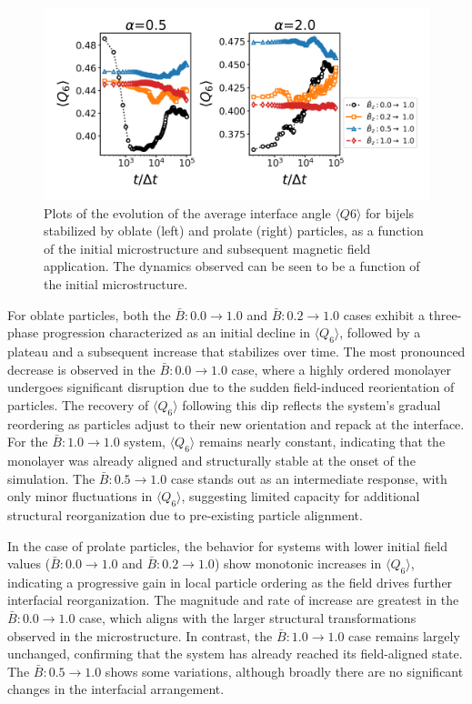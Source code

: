 \begin{figure} 
    \centering 
    \includegraphics[scale=0.6]{../figures/results/paper2/Q6-field_up.png} 
    \caption{Plots of the evolution of the average interface angle \(\langle Q6 \rangle\) for bijels stabilized 
             by oblate (left) and prolate (right) particles, as a function of the initial microstructure and subsequent magnetic field application.
             The dynamics observed can be seen to be a function of the initial microstructure.} 
    \label{fig:Q6-field_up} 
\end{figure}

For oblate particles, both the \(\bar{B}: 0.0 \rightarrow 1.0\) and 
\(\bar{B}: 0.2 \rightarrow 1.0\) cases exhibit a three-phase progression characterized as an initial decline in \(\langle Q_6 \rangle\), followed by a 
plateau and a subsequent increase that stabilizes over time. The most pronounced decrease is observed in the \(\bar{B}: 0.0 \rightarrow 1.0\) case, where a 
highly ordered monolayer undergoes significant disruption due to the sudden field-induced reorientation of particles. The recovery of \(\langle Q_6 \rangle\) 
following this dip reflects the system's gradual reordering as particles adjust to their new orientation and repack at the interface.
For the \(\bar{B}: 1.0 \rightarrow 1.0\) system, \(\langle Q_6 \rangle\) remains nearly constant, indicating that the monolayer was already aligned and 
structurally stable at the onset of the simulation. The \(\bar{B}: 0.5 \rightarrow 1.0\) case stands out as an intermediate response, with only minor 
fluctuations in \(\langle Q_6 \rangle\), suggesting limited capacity for additional structural reorganization due to pre-existing particle alignment.

In the case of prolate particles, the behavior for systems with lower initial field values (\(\bar{B}: 0.0 \rightarrow 1.0\) 
and \(\bar{B}: 0.2 \rightarrow 1.0\)) show monotonic increases in \(\langle Q_6 \rangle\), indicating a progressive gain in local particle ordering as the 
field drives further interfacial reorganization. The magnitude and rate of increase are greatest in the \(\bar{B}: 0.0 \rightarrow 1.0\) case, which aligns with 
the larger structural transformations observed in the microstructure. In contrast, the \(\bar{B}: 1.0 \rightarrow 1.0\) case remains largely unchanged, 
confirming that the system has already reached its field-aligned state. The $\bar{B}: 0.5 \rightarrow 1.0$ shows some variations, although broadly there are no
significant changes in the interfacial arrangement. 

